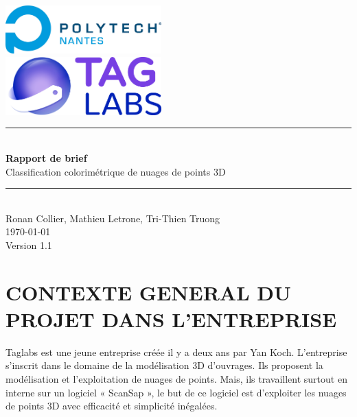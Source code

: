 \documentclass[12pt,titlepage]{report}
\begin{document}
\renewcommand{\thesection}{\arabic{section}} %

\begin{titlepage}
\newcommand{\HRule}{\rule{\linewidth}{0.5mm}}
\center

	\includegraphics[width=0.45\textwidth]{./image2.png}\\[1cm]
   
	\includegraphics[width=0.45\textwidth]{./image1.png}


\HRule \\[0.4cm]
{ \huge \bfseries Rapport de brief \\[0.15cm] }
Classification colorimétrique de nuages de points 3D
\HRule \\[1.5cm]
Ronan Collier,
Mathieu Letrone,
Tri-Thien Truong
\\[1cm]
\today \\ [1cm]
Version 1.1
\end{titlepage}
\vspace{\baselineskip}



\vspace{\baselineskip}

\section{CONTEXTE GENERAL DU PROJET DANS L’ENTREPRISE}

\vspace{\baselineskip}
\begin{justify}
Taglabs est une jeune entreprise créée il y a deux ans par Yan Koch. L’entreprise s’inscrit dans le domaine de la modélisation 3D d’ouvrages. Ils proposent la modélisation et l’exploitation de nuages de points. Mais, ils travaillent surtout en interne sur un logiciel « ScanSap », le but de ce logiciel est d’exploiter les nuages de points 3D avec efficacité et simplicité inégalées.
\end{justify}\par
\end{document}
